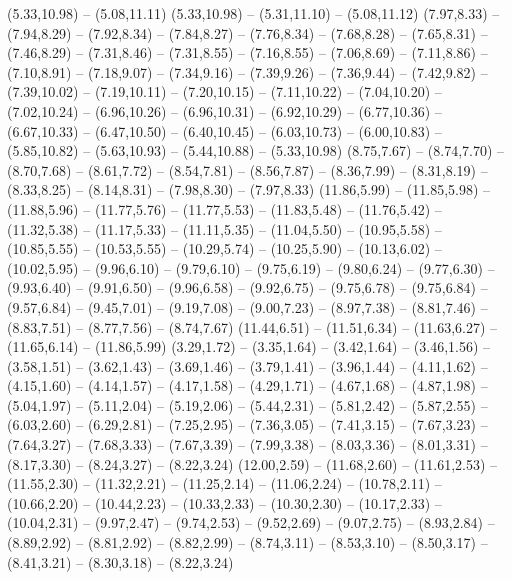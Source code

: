 \expandafter\def\csname geo:fluss:Elbe\endcsname{
  (5.33,10.98) -- (5.08,11.11)
  (5.33,10.98) -- (5.31,11.10) -- (5.08,11.12)
  (7.97,8.33) -- (7.94,8.29) -- (7.92,8.34) -- (7.84,8.27) -- (7.76,8.34) -- (7.68,8.28) -- (7.65,8.31) -- (7.46,8.29) -- (7.31,8.46) -- (7.31,8.55) -- (7.16,8.55) -- (7.06,8.69) -- (7.11,8.86) -- (7.10,8.91) -- (7.18,9.07) -- (7.34,9.16) -- (7.39,9.26) -- (7.36,9.44) -- (7.42,9.82) -- (7.39,10.02) -- (7.19,10.11) -- (7.20,10.15) -- (7.11,10.22) -- (7.04,10.20) -- (7.02,10.24) -- (6.96,10.26) -- (6.96,10.31) -- (6.92,10.29) -- (6.77,10.36) -- (6.67,10.33) -- (6.47,10.50) -- (6.40,10.45) -- (6.03,10.73) -- (6.00,10.83) -- (5.85,10.82) -- (5.63,10.93) -- (5.44,10.88) -- (5.33,10.98)
  (8.75,7.67) -- (8.74,7.70) -- (8.70,7.68) -- (8.61,7.72) -- (8.54,7.81) -- (8.56,7.87) -- (8.36,7.99) -- (8.31,8.19) -- (8.33,8.25) -- (8.14,8.31) -- (7.98,8.30) -- (7.97,8.33)
  (11.86,5.99) -- (11.85,5.98) -- (11.88,5.96) -- (11.77,5.76) -- (11.77,5.53) -- (11.83,5.48) -- (11.76,5.42) -- (11.32,5.38) -- (11.17,5.33) -- (11.11,5.35) -- (11.04,5.50) -- (10.95,5.58) -- (10.85,5.55) -- (10.53,5.55) -- (10.29,5.74) -- (10.25,5.90) -- (10.13,6.02) -- (10.02,5.95) -- (9.96,6.10) -- (9.79,6.10) -- (9.75,6.19) -- (9.80,6.24) -- (9.77,6.30) -- (9.93,6.40) -- (9.91,6.50) -- (9.96,6.58) -- (9.92,6.75) -- (9.75,6.78) -- (9.75,6.84) -- (9.57,6.84) -- (9.45,7.01) -- (9.19,7.08) -- (9.00,7.23) -- (8.97,7.38) -- (8.81,7.46) -- (8.83,7.51) -- (8.77,7.56) -- (8.74,7.67)
  (11.44,6.51) -- (11.51,6.34) -- (11.63,6.27) -- (11.65,6.14) -- (11.86,5.99)}
\expandafter\def\csname geo:fluss:Donau\endcsname{
  (3.29,1.72) -- (3.35,1.64) -- (3.42,1.64) -- (3.46,1.56) -- (3.58,1.51) -- (3.62,1.43) -- (3.69,1.46) -- (3.79,1.41) -- (3.96,1.44) -- (4.11,1.62) -- (4.15,1.60) -- (4.14,1.57) -- (4.17,1.58) -- (4.29,1.71) -- (4.67,1.68) -- (4.87,1.98) -- (5.04,1.97) -- (5.11,2.04) -- (5.19,2.06) -- (5.44,2.31) -- (5.81,2.42) -- (5.87,2.55) -- (6.03,2.60) -- (6.29,2.81) -- (7.25,2.95) -- (7.36,3.05) -- (7.41,3.15) -- (7.67,3.23) -- (7.64,3.27) -- (7.68,3.33) -- (7.67,3.39) -- (7.99,3.38) -- (8.03,3.36) -- (8.01,3.31) -- (8.17,3.30) -- (8.24,3.27) -- (8.22,3.24)
  (12.00,2.59) -- (11.68,2.60) -- (11.61,2.53) -- (11.55,2.30) -- (11.32,2.21) -- (11.25,2.14) -- (11.06,2.24) -- (10.78,2.11) -- (10.66,2.20) -- (10.44,2.23) -- (10.33,2.33) -- (10.30,2.30) -- (10.17,2.33) -- (10.04,2.31) -- (9.97,2.47) -- (9.74,2.53) -- (9.52,2.69) -- (9.07,2.75) -- (8.93,2.84) -- (8.89,2.92) -- (8.81,2.92) -- (8.82,2.99) -- (8.74,3.11) -- (8.53,3.10) -- (8.50,3.17) -- (8.41,3.21) -- (8.30,3.18) -- (8.22,3.24)}
